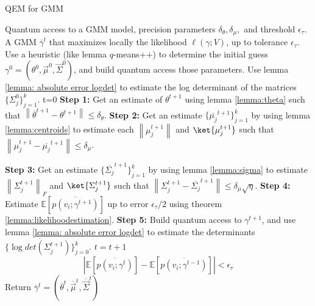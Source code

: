 \documentclass{article}
\newcommand{\norm}[1]{\left\lVert#1\right\rVert}
\begin{document}
\pagestyle{empty} 


\begin{algorithm}[ht]
	\caption{QEM for GMM  }
	\begin{algorithmic}[1]

			\Require Quantum access to a GMM model, precision parameters $\delta_\theta, \delta_\mu,$ and threshold $\epsilon_\tau$.
			\Ensure  A GMM $\overline{\gamma}^t$ that maximizes locally the likelihood $\ell(\gamma;V)$, up to tolerance $\epsilon_\tau$.
			\vspace{10pt}
			\State Use a heuristic (like lemma $q$-means++) to determine the initial guess  $\gamma^0=(\theta^0, \vec \mu^0, \vec \Sigma^0)$, and build quantum access those parameters.
			\State Use lemma \ref{lemma: absolute error logdet} to estimate the log determinant of the matrices $\{ \Sigma_j^0 \}_{j=1}^k$.
			\State t=0
			\Repeat
			 \State \textbf{Step 1:} Get an estimate of $\theta^{t+1}$ using lemma \ref{lemma:theta} such that
			 $\norm{\overline{\theta}^{t+1} - \theta^{t+1}} \leq\delta_\theta. $ %
			\State \textbf{Step 2:} Get an estimate $\{ \overline{\mu_j}^{t+1} \}_{j=1}^k$ by using lemma \ref{lemma:centroids} to estimate  each $\norm{\mu_j^{t+1}} $ and $\ket{\mu_j^{t+1}}$ such that
			$\norm{\mu_j^{t+1} - \overline{\mu_j}^{t+1}} \leq \delta_\mu $.

			\State \textbf{Step 3:} Get an estimate $\{ \overline{\Sigma_j}^{t+1} \}_{j=1}^k$ by using lemma \ref{lemma:sigma} to estimate $\norm{\Sigma_j^{t+1}}_F$ and $\ket{\Sigma_j^{t+1}}$ such that
			$ \norm{\Sigma_j^{t+1} - \overline{\Sigma_j}^{t+1} } \leq \delta_{\mu} \sqrt{\eta} $.
			\State \textbf{Step 4:} Estimate $\mathbb{E}[ \overline{p(v_i;\gamma^{t+1})}]$  up to error $\epsilon_\tau/2$ using theorem \ref{lemma:likelihoodestimation}.
			\State \textbf{Step 5:} Build quantum access to $\gamma^{t+1}$, and use lemma \ref{lemma: absolute error logdet} to estimate the determinants $\{ \overline{\log det(\Sigma_j^{t+1})} \}_{j=0}^k$.
			\State $t=t+1$
			\Until
			$$| \mathbb{E}[ \overline{p(v_i;\gamma^{t})}] - \mathbb{E}[\overline{p(v_i;\gamma^{t-1})}] | < \epsilon_\tau$$
			\State Return $\overline{\gamma}^{t}=(\overline{\theta}^t, \overline{\vec \mu}^t, \overline{\vec \Sigma}^t )$
	\end{algorithmic}
\end{algorithm}
\end{document}
